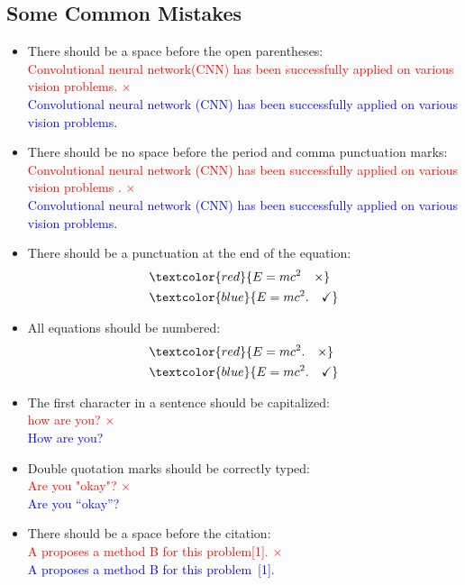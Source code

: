 \documentclass[10pt,twocolumn,letterpaper]{article}
\newcommand{\correct}[1]{\textcolor{blue}{#1 \checkmark}}
\newcommand{\wrong}[1]{\textcolor{red}{#1 $\times$}}
\begin{document}
\subsection{Some Common Mistakes}
\begin{itemize}
    \item There should be a space before the open parentheses:\\
        \wrong{Convolutional neural network(CNN) has been successfully applied on various vision problems.}\\
        \correct{Convolutional neural network (CNN) has been successfully applied on various vision problems.}
    \item There should be no space before the period and comma punctuation marks:\\
        \wrong{Convolutional neural network (CNN) has been successfully applied on various vision problems .}\\
        \correct{Convolutional neural network (CNN) has been successfully applied on various vision problems.}
    \item There should be a punctuation at the end of the equation:
        \begin{align}
            \label{eq:eq1}
            & \textcolor{red}{E = mc^2 \quad \times} \\
            & \textcolor{blue}{E = mc^2. \quad \checkmark}
        \end{align}
    \item All equations should be numbered:
        \begin{align}
            \label{eq:eq2} \nonumber
            & \textcolor{red}{E = mc^2. \quad \times}\\ 
            & \textcolor{blue}{E = mc^2. \quad \checkmark}
        \end{align}
    \item The first character in a sentence should be capitalized:\\
        \wrong{how are you?}\\
        \correct{How are you?}
    \item Double quotation marks should be correctly typed:\\
        \wrong{Are you "okay"?}\\
        \correct{Are you ``okay''?}
    \item There should be a space before the citation:\\
        \wrong{A proposes a method B for this problem[1].}\\
        \correct{A proposes a method B for this problem~[1].}
\end{itemize}
\end{document}
